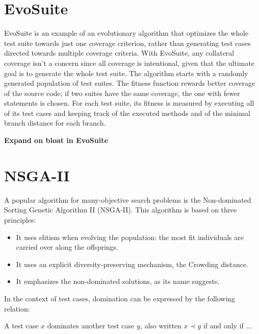 \section{EvoSuite}
EvoSuite is an example of an evolutionary algorithm that optimizes the whole test suite towards just one coverage criterion, rather than generating test cases directed towards multiple coverage criteria.
With EvoSuite, any collateral coverage isn't a concern since all coverage is intentional, given that the ultimate goal is to generate the whole test suite.
The algorithm starts with a randomly generated population of test suites.
The fitness function rewards better coverage of the source code; if two suites have the same coverage, the one with fewer statements is chosen. For each test suite, its fitness is measured by executing all of its test cases and keeping track of the executed methods and of the minimal branch distance for each branch.

\textbf{Expand on bloat in EvoSuite}





\section{NSGA-II}
A popular algorithm for many-objective search problems is the Non-dominated Sorting Genetic Algorithm II (NSGA-II). This algorithm is based on three principles:

\begin{itemize}
    \item It uses elitism when evolving the population: the most fit individuals are carried over along the offsprings.
    \item It uses an explicit diversity-preserving mechanism, the Crowding distance.
    \item It emphasizes the non-dominated solutions, as its name suggests.
\end{itemize}

In the context of test cases, domination can be expressed by the following relation:
\begin{definition}
    A test case $ x $ dominates another test case $ y $, also written $ x  \prec y $ if and only if ...
\end{definition}

